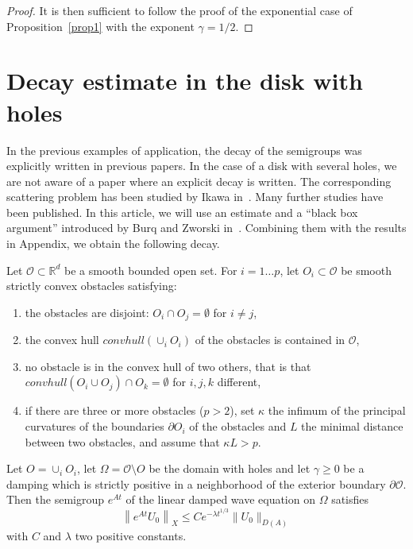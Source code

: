 \documentclass[AHL,Unicode,longabstracts]{cedram}
\newcommand{\RR}{\mathbb{R}}
\newcommand{\Oc}{\mathcal{O}}
\newcommand{\cnvh}{convhull}
\newcommand*{\alphenumi}{\renewcommand*{\theenumi}{\alph{enumi}}}
\begin{document}
\begin{proof}
It is then sufficient to follow the proof of the exponential case of Proposition~\ref{prop1} with the exponent $\gamma=1/2$.
\end{proof}


\section{Decay estimate in the disk with holes}\label{section-decay-disk}
In the previous examples of application, the decay of the semigroups was explicitly written in previous papers. In the case of a disk with several holes, we are not aware of a paper where an explicit decay is written. The corresponding scattering problem has been studied by Ikawa in~\cite{Ikawa1,Ikawa2}. Many further studies have been published. In this article, we will use an estimate and a ``black box argument'' introduced by Burq and Zworski in~\cite{Burq-Zworski}. Combining them with the results in Appendix, we obtain the following decay.

\begin{theo}\label{th-decay-disque-trous}
Let $\Oc\subset\RR^d$ be a smooth bounded open set. For $i=1\ldots p$, let $O_i\subset \Oc$ be smooth strictly convex obstacles satisfying:
\begin{enumerate}\alphenumi
\item \label{listtheo8.1.1}the obstacles are disjoint: $O_i\cap O_j=\emptyset$ for $i\neq j$,
\item \label{listtheo8.1.2}the convex hull $\cnvh(\cup_i O_i)$ of the obstacles is contained in $\Oc$,
\item \label{listtheo8.1.3}no obstacle is in the convex hull of two others, that is that $\cnvh(O_i\cup O_j)\cap O_k =\emptyset$ for $i,j,k$ different,
\item \label{listtheo8.1.4}if there are three or more obstacles ($p>2$), set $\kappa$ the infimum of the principal curvatures of the boundaries $\partial O_i$ of the obstacles and $L$ the minimal distance between two obstacles, and assume that $\kappa L>p$.
\end{enumerate}
Let $O=\cup_i O_i$, let $\Omega=\Oc\setminus O$ be the domain with holes and let $\gamma\geq 0$ be a damping which is strictly positive in a neighborhood of the exterior boundary $\partial \Oc$. Then the semigroup $e^{At}$ of the linear damped wave equation on $\Omega$ satisfies
\[
\left\|e^{At}U_0\right\|_X \leq C e^{-\lambda t^{1/3}} \|U_0\|_{D(A)}
\]
with $C$ and $\lambda$ two positive constants.
\end{theo}
\end{document}
